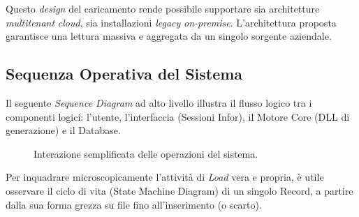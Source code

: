 Questo \textit{design} del caricamento rende possibile supportare sia architetture \textit{multitenant} \textit{cloud}, sia installazioni \textit{legacy} \textit{on-premise}.
L'architettura proposta garantisce una lettura massiva e aggregata da un singolo sorgente aziendale.

\subsection{Sequenza Operativa del Sistema}\label{subsec:sequenza-operativa-del-sistema}
Il seguente \textit{Sequence Diagram} ad alto livello illustra il flusso logico tra i componenti logici: l'utente,
l'interfaccia (Sessioni Infor), il Motore Core (DLL di generazione) e il Database.
\begin{figure}[H]
    \centering
    \caption{Interazione semplificata delle operazioni del sistema.}
    \label{fig:sequence_diagram}
\end{figure}

Per inquadrare microscopicamente l'attività di \textit{Load} vera e propria, è utile osservare il ciclo di vita (State Machine Diagram) di un singolo Record, 
a partire dalla sua forma grezza su file fino all'inserimento (o scarto).


